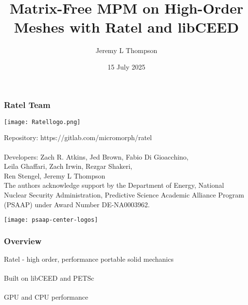 \documentclass{beamer}
\title[Ratel]{Matrix-Free MPM on High-Order Meshes with Ratel and libCEED} %
\author{Jeremy L Thompson} %
\institute[CU Boulder] %
{University of Colorado Boulder \\ %
\medskip
\textit{jeremy@jeremylt.org} %
}
\date{15 July 2025} %
\begin{document}
\begin{frame}
\titlepage %
\end{frame}
 

\begin{frame}
\frametitle{Ratel Team}

\begin{center}
\texttt{[image: Ratellogo.png]}
\end{center}

{\flushleft

Repository: https://gitlab.com/micromorph/ratel\\

~\\

Developers: Zach R. Atkins, Jed Brown, Fabio Di Gioacchino,\\
\hspace{19mm} Leila Ghaffari, Zach Irwin, Rezgar Shakeri,\\
\hspace{19mm} Ren Stengel, Jeremy L Thompson\\

The authors acknowledge support by the Department of Energy, National Nuclear Security Administration, Predictive Science Academic Alliance Program (PSAAP) under Award Number DE-NA0003962.

}

\begin{center}
\texttt{[image: psaap-center-logos]}
\end{center}

\end{frame}


\begin{frame}
\begin{center}
\frametitle{Overview}

Ratel - high order, performance portable solid mechanics\\

~\\

Built on libCEED and PETSc\\

~\\

GPU and CPU performance\\

~\\

\end{center}
\end{frame}
 
\end{document}
